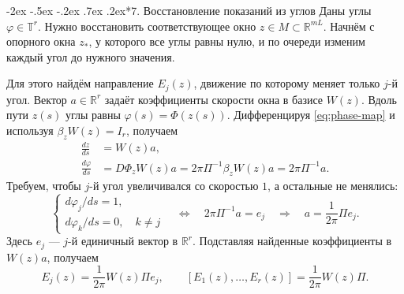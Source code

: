 \documentclass[11pt,a4paper]{article}
\makeatletter
\renewcommand\section{\@startsection{section}{1}{\z@}%
  {-2ex \@plus -.5ex \@minus -.2ex}%
  {.7ex \@plus .2ex}{\normalfont\Large\bfseries}}
\makeatother
\begin{document}
\section*{7. Восстановление показаний из углов}
Даны углы $\varphi\in\mathbb T^r$. Нужно восстановить соответствующее
окно $z\in M\subset\mathbb R^{mL}$. Начнём с опорного окна $z_*$,
у которого все углы равны нулю, и по очереди изменим каждый угол до нужного значения.

Для этого найдём направление $E_j(z)$, движение по которому меняет
только $j$-й угол. Вектор $a\in\mathbb R^r$ задаёт коэффициенты
скорости окна в базисе $W(z)$. Вдоль пути $z(s)$ углы равны
$\varphi(s)=\Phi(z(s))$. Дифференцируя \eqref{eq:phase-map}
и используя $\beta_zW(z)=I_r$, получаем
$$
\begin{aligned}
\frac{dz}{ds}&=W(z)a,\\[3pt]
\frac{d\varphi}{ds}&=D\Phi_zW(z)a
=2\pi\Pi^{-1}\beta_zW(z)a
=2\pi\Pi^{-1}a.
\end{aligned}
$$
Требуем, чтобы $j$-й угол увеличивался со скоростью $1$, а остальные не менялись:
$$
\begin{cases}
d\varphi_j/ds=1,\\
d\varphi_k/ds=0,\quad k\ne j
\end{cases}
\quad\Longleftrightarrow\quad
2\pi\Pi^{-1}a=e_j
\quad\Longrightarrow\quad
a=\frac{1}{2\pi}\Pi e_j.
$$
Здесь $e_j$ --- $j$-й единичный вектор в $\mathbb R^r$.
Подставляя найденные коэффициенты в $W(z)a$, получаем
\begin{equation}
E_j(z)=\frac{1}{2\pi}W(z)\Pi e_j,
\qquad [E_1(z),\ldots,E_r(z)]=\frac{1}{2\pi}W(z)\Pi.
\label{eq:phase-fields}
\end{equation}
\end{document}
